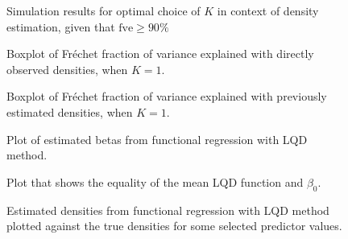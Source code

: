 \begin{figure}[h]
    \centering
    \resizebox{0.9\textwidth}{!}{}
    \caption[Simulation results: optimal $K$]{Simulation results for optimal choice of
    $K$ in context of density estimation, given that $\text{fve} \geq 90 \%$}
    \label{fig:sim_k_opt_denstimation}
\end{figure}

\begin{figure}[h]
    \centering
    \resizebox{0.9\textwidth}{!}{}
    \caption[Simulation results: boxplots fve --- observed densities]{Boxplot of
    Fréchet fraction of variance explained with directly observed
    densities, when $K = 1$.}
    \label{fig:sim_fve}
\end{figure}

\begin{figure}[h]
    \centering
    \resizebox{0.9\textwidth}{!}{}
    \caption[Simulation results: boxplots fve --- estimated densities]{Boxplot of
    Fréchet fraction of variance explained with previously estimated densities, when
    $K = 1$.}
    \label{fig:sim_fve_denstimation}
\end{figure}

\begin{figure}[h]
    \centering
    \resizebox{1\textwidth}{!}{}
    \caption[Estimated betas in LQD functional regression]{Plot of estimated betas from
    functional regression with LQD method.}
    \label{fig:betas}
\end{figure}

\begin{figure}[h]
    \centering
    \resizebox{1\textwidth}{!}{}
    \caption[Equality of mean LQD function and $\beta_0$]{Plot that shows the equality
    of the mean LQD function and $\beta_0$.}
    \label{fig:beta0vsmean}
\end{figure}

\begin{figure}[h]
    \centering
    \resizebox{1\textwidth}{!}{}
    \caption[Comparison: estimated vs. true densities --- LQD]{Estimated densities from
    functional regression with LQD method plotted against the true densities for some
    selected predictor values.}
    \label{fig:func_est_vs_true}
\end{figure}

